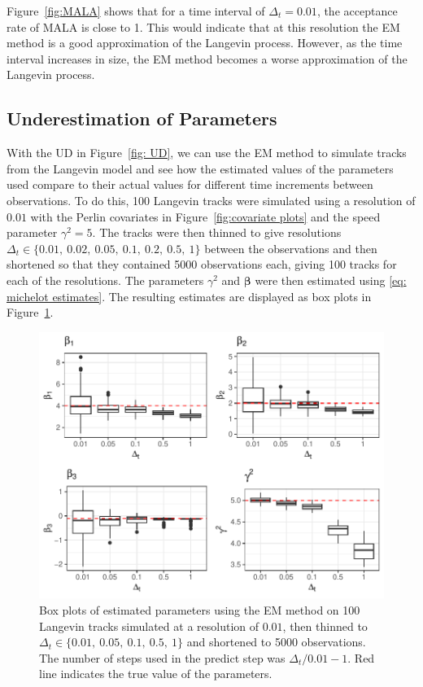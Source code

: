 Figure~\ref{fig:MALA} shows that for a time interval of $\Delta_t =0.01$, the acceptance rate of MALA is close to 1. This would indicate that at this resolution the EM method is a good approximation of the Langevin process. However, as the time interval increases in size, the EM method becomes a worse approximation of the Langevin process.


\subsection{Underestimation of Parameters}

With the UD in Figure~\ref{fig: UD}, we can use the EM method to simulate tracks from the Langevin model and see how the estimated values of the parameters used compare to their actual values for different time increments between observations. To do this, 100 Langevin tracks were simulated using a resolution of $0.01$ with the Perlin covariates in Figure~\ref{fig:covariate plots} and the speed parameter $\gamma^2 = 5$. The tracks were then thinned to give resolutions $\Delta_t \in \{0.01, \ 0.02, \ 0.05, \ 0.1, \ 0.2, \ 0.5, \ 1 \}$ between the observations and then shortened so that they contained 5000 observations each, giving 100 tracks for each of the resolutions. The parameters $\gamma^2$ and $\bm \beta$ were then estimated using \eqref{eq: michelot estimates}. The resulting estimates are displayed as box plots in Figure~\ref{fig:EM_thin_boxplot}.


\begin{figure}[H]
    \centering
    \includegraphics[width=\linewidth]{Images/background/varying dt EM boxplot.pdf}
    \caption[Euler-Mauryama estimates]{Box plots of estimated parameters using the EM method on 100 Langevin tracks simulated at a resolution of $0.01$, then thinned to $\Delta_t \in \{0.01, \ 0.05, \ 0.1, \ 0.5, \ 1\}$ and shortened to 5000 observations. The number of steps used in the predict step was $\Delta_t/0.01-1$. Red line indicates the true value of the parameters.}
    \label{fig:EM_thin_boxplot}
\end{figure}


